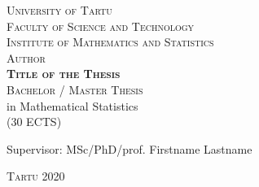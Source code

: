 \begin{titlepage}
\begin{center}

{\large \textsc{University of Tartu}}\\
\textsc{Faculty of Science and Technology}\\
\textsc{Institute of Mathematics and Statistics}\\[4.5cm]

{\large\textsc{Author}}\\[0.2cm]
{\Large\textsc{\bfseries Title of the Thesis}}\\[0.2cm]
\textsc{Bachelor / Master Thesis}\\[0.2cm]
in Mathematical Statistics\\[0.2cm]
(30 ECTS)\\[3.2cm]

{\hfill \sffamily Supervisor: MSc/PhD/prof. Firstname Lastname}


\textsc{Tartu 2020}
\end{center}
\end{titlepage}